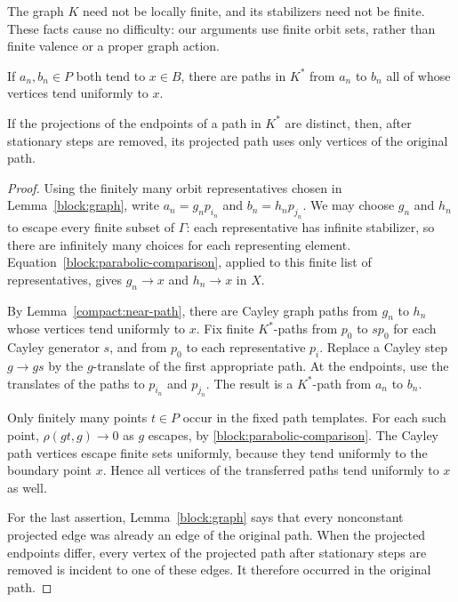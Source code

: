 The graph $K$ need not be locally finite, and its stabilizers need not
be finite.  These facts cause no difficulty: our arguments use finite
orbit sets, rather than finite valence or a proper graph action.

\begin{lemma}\label{block:near-path}
If $a_n,b_n\in P$ both tend to $x\in B$, there are paths in $K^*$ from
$a_n$ to $b_n$ all of whose vertices tend uniformly to $x$.

If the projections of the endpoints of a path in $K^*$ are distinct,
then, after stationary steps are removed, its projected path uses
only vertices of the original path.
\end{lemma}

\begin{proof}
Using the finitely many orbit representatives chosen in
Lemma~\ref{block:graph}, write
$a_n=g_np_{i_n}$ and $b_n=h_np_{j_n}$.  We may choose $g_n$ and $h_n$
to escape every finite subset of $\Gamma$: each representative has
infinite stabilizer, so there are infinitely many choices for each
representing element.  Equation~\eqref{block:parabolic-comparison},
applied to this finite list of representatives, gives
$g_n\to x$ and $h_n\to x$ in $X$.

By Lemma~\ref{compact:near-path}, there are Cayley graph paths from
$g_n$ to $h_n$ whose vertices tend uniformly to $x$.  Fix finite
$K^*$-paths from $p_0$ to $sp_0$ for each Cayley generator $s$, and
from $p_0$ to each representative $p_i$.  Replace a Cayley step
$g\longrightarrow gs$ by the $g$-translate of the first appropriate
path.  At the endpoints, use the translates of the paths to $p_{i_n}$
and $p_{j_n}$.  The result is a $K^*$-path from $a_n$ to $b_n$.

Only finitely many points $t\in P$ occur in the fixed path templates.
For each such point, $\rho(gt,g)\to0$ as $g$ escapes, by
\eqref{block:parabolic-comparison}.  The Cayley path vertices escape
finite sets uniformly, because they tend uniformly to the boundary
point $x$.  Hence all vertices of the transferred paths tend uniformly
to $x$ as well.

For the last assertion, Lemma~\ref{block:graph} says that every
nonconstant projected edge was already an edge of the original path.
When the projected endpoints differ, every vertex of the projected
path after stationary steps are removed is incident to one of these
edges.  It therefore occurred in the original path.
\end{proof}

